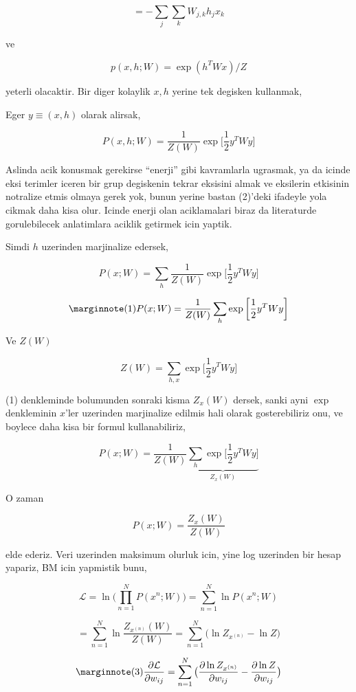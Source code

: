 \documentclass[12pt,fleqn]{article}\usepackage{../common}
\begin{document}
$$ = - \sum_j \sum_k W_{j,k}h_jx_k  $$

ve

$$ p(x,h;W)  = \exp (h^TWx) / Z $$

yeterli olacaktir. Bir diger kolaylik $x,h$ yerine tek degisken kullanmak,

Eger $y \equiv (x,h)$ olarak alirsak, 


$$ P(x,h;W) = \frac{1}{Z(W)} \exp 
\bigg[ 
\frac{1}{2} y^T W y
\bigg]
$$

Aslinda acik konusmak gerekirse ``enerji'' gibi kavramlarla ugrasmak, ya da
icinde eksi terimler iceren bir grup degiskenin tekrar eksisini almak ve
eksilerin etkisinin notralize etmis olmaya gerek yok, bunun yerine bastan
(2)'deki ifadeyle yola cikmak daha kisa olur. Icinde enerji olan
aciklamalari biraz da literaturde gorulebilecek anlatimlara aciklik
getirmek icin yaptik.

Simdi $h$ uzerinden marjinalize edersek,

$$ P(x;W) = \sum_h \frac{1}{Z(W)} \exp 
\bigg[ 
\frac{1}{2} y^T W y
\bigg]
$$


$$  
\mlabel{1}
P(x;W) = \frac{1}{Z(W)}  \sum_h \exp 
\bigg[ 
\frac{1}{2} y^T W y
\bigg]
$$


Ve $Z(W)$ 

$$ Z(W) = \sum_{h,x} \exp 
\bigg[ 
\frac{1}{2} y^T W y
\bigg]
$$

(1) denkleminde bolumunden sonraki kisma $Z_x(W)$ dersek, sanki ayni $\exp$
denkleminin $x$'ler uzerinden marjinalize edilmis hali olarak
gosterebiliriz onu, ve boylece daha kisa bir formul kullanabiliriz,

$$  
P(x;W) = \frac{1}{Z(W)}  
\underbrace{
\sum_h \exp 
\bigg[ 
\frac{1}{2} y^T W y
\bigg]
}_{Z_x(W)}
$$

O zaman 

$$  
P(x;W) = \frac{Z_x(W)}{Z(W)} 
$$

elde ederiz. Veri uzerinden maksimum olurluk icin, yine log uzerinden bir
hesap yapariz, BM icin yapmistik bunu,

$$  
\mathcal{L} = 
\ln \big( \prod_{n=1}^{N} P(x^{n};W) \big) = 
\sum_{n=1}^{N} \ln P(x^{n};W) 
$$

$$ 
= \sum_{n=1}^{N} \ln \frac{Z_{x^{(n)}}(W)}{Z(W)}  
= \sum_{n=1}^{N}  \big(\ln Z_{x^{(n)}} - \ln Z \big) 
$$

$$ 
\mlabel{3}
\frac{\partial \mathcal{L} }{\partial w_{ij}} = 
\sum_{n=1}^{N}  \big( \frac{\partial \ln Z_{x^{(n)}} }{\partial w_{ij}}
- \frac{\partial \ln Z }{\partial w_{ij}} \big)
$$
\end{document}
